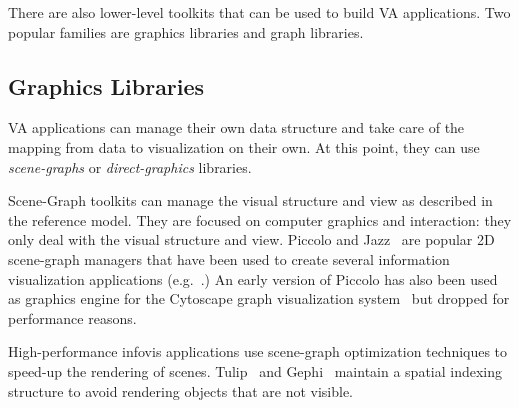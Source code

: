 There are also lower-level toolkits that can be used to build VA
applications.  Two popular families are graphics libraries
and graph libraries.


\subsection{Graphics Libraries}

VA applications can manage their own data structure and
take care of the mapping from data to visualization on their own.  At
this point, they can use \emph{scene-graphs} or \emph{direct-graphics}
libraries.  

Scene-Graph toolkits can manage the visual structure and view as
described in the reference model.  They are focused on computer
graphics and interaction: they only deal with the visual structure and
view.  Piccolo and Jazz~\cite{Polylithic} are popular 2D scene-graph
managers that have been used to create several information
visualization applications (e.g.~\cite{SpaceTree,Geneaquilt}.) An
early version of Piccolo has also been used as graphics engine for the
Cytoscape graph visualization system~\cite{Cytoscape} but dropped for
performance reasons.

High-performance infovis applications use scene-graph optimization
techniques to speed-up the rendering of scenes.  Tulip~\cite{Tulip}
and Gephi~\cite{Gephi} maintain a spatial indexing structure to avoid
rendering objects that are not visible.

